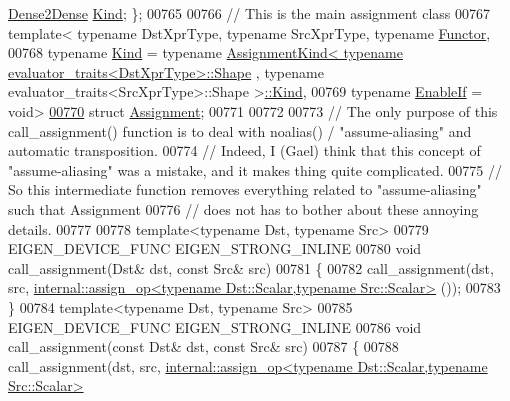 \begin{DoxyCode}
      \hyperlink{struct_eigen_1_1internal_1_1_dense2_dense}{Dense2Dense} \hyperlink{struct_eigen_1_1internal_1_1_dense2_dense}{Kind}; \};
00765     
00766 \textcolor{comment}{// This is the main assignment class}
00767 \textcolor{keyword}{template}< \textcolor{keyword}{typename} DstXprType, \textcolor{keyword}{typename} SrcXprType, \textcolor{keyword}{typename} \hyperlink{struct_functor}{Functor},
00768           \textcolor{keyword}{typename} \hyperlink{struct_eigen_1_1internal_1_1_dense2_dense}{Kind} = \textcolor{keyword}{typename} 
      \hyperlink{struct_eigen_1_1internal_1_1_assignment_kind}{AssignmentKind< typename evaluator\_traits<DstXprType>::Shape}
       , \textcolor{keyword}{typename} evaluator\_traits<SrcXprType>::Shape >\hyperlink{struct_eigen_1_1internal_1_1_dense2_dense}{::Kind},
00769           \textcolor{keyword}{typename} \hyperlink{struct_eigen_1_1internal_1_1_enable_if}{EnableIf} = \textcolor{keywordtype}{void}>
\hyperlink{struct_eigen_1_1internal_1_1_assignment}{00770} \textcolor{keyword}{struct }\hyperlink{struct_eigen_1_1internal_1_1_assignment}{Assignment};
00771 
00772 
00773 \textcolor{comment}{// The only purpose of this call\_assignment() function is to deal with noalias() / "assume-aliasing" and
       automatic transposition.}
00774 \textcolor{comment}{// Indeed, I (Gael) think that this concept of "assume-aliasing" was a mistake, and it makes thing quite
       complicated.}
00775 \textcolor{comment}{// So this intermediate function removes everything related to "assume-aliasing" such that Assignment}
00776 \textcolor{comment}{// does not has to bother about these annoying details.}
00777 
00778 \textcolor{keyword}{template}<\textcolor{keyword}{typename} Dst, \textcolor{keyword}{typename} Src>
00779 EIGEN\_DEVICE\_FUNC EIGEN\_STRONG\_INLINE
00780 \textcolor{keywordtype}{void} call\_assignment(Dst& dst, \textcolor{keyword}{const} Src& src)
00781 \{
00782   call\_assignment(dst, src, 
      \hyperlink{struct_eigen_1_1internal_1_1assign__op}{internal::assign\_op<typename Dst::Scalar,typename Src::Scalar>}
      ());
00783 \}
00784 \textcolor{keyword}{template}<\textcolor{keyword}{typename} Dst, \textcolor{keyword}{typename} Src>
00785 EIGEN\_DEVICE\_FUNC EIGEN\_STRONG\_INLINE
00786 \textcolor{keywordtype}{void} call\_assignment(\textcolor{keyword}{const} Dst& dst, \textcolor{keyword}{const} Src& src)
00787 \{
00788   call\_assignment(dst, src, 
      \hyperlink{struct_eigen_1_1internal_1_1assign__op}{internal::assign\_op<typename Dst::Scalar,typename Src::Scalar>}

\end{DoxyCode}
